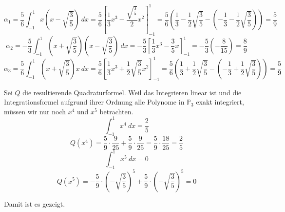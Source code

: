 \documentclass[10pt,a4paper]{article}
\begin{document}
\begin{equation}
  \alpha_{1} = \frac{5}{6} \int_{-1}^{1} x(x - \sqrt{\frac{3}{5}})\ dx = \frac{5}{6} \left[ \frac{1}{3}x^{3} - \frac{\sqrt{\frac{3}{5}}}{2}x^{2} \right]_{-1}^{1} = \frac{5}{6}\left( \frac{1}{3} - \frac{1}{2}\sqrt{\frac{3}{5}} - \left(-\frac{1}{3} - \frac{1}{2}\sqrt{\frac{3}{5}} \right) \right) = \frac{5}{9}
\end{equation}
\begin{equation}
  \alpha_{2} = -\frac{5}{3} \int_{-1}^{1} (x + \sqrt{\frac{3}{5}})(x - \sqrt{\frac{3}{5}})\ dx = -\frac{5}{3} \left[ \frac{1}{3}x^{3} - \frac{3}{5}x \right]_{-1}^{1} = -\frac{5}{3}(-\frac{8}{15}) = \frac{8}{9}
\end{equation}
\begin{equation}
  \alpha_{3} = \frac{5}{6} \int_{-1}^{1} (x + \sqrt{\frac{3}{5}})x\ dx = \frac{5}{6} \left[ \frac{1}{3}x^{3} + \frac{1}{2}\sqrt{\frac{3}{5}}x^{2} \right]_{-1}^{1} = \frac{5}{6}\left( \frac{1}{3} + \frac{1}{2}\sqrt{\frac{3}{5}} - \left( -\frac{1}{3} + \frac{1}{2}\sqrt{\frac{3}{5}} \right) \right) = \frac{5}{9}
\end{equation}

Sei $Q$ die resultierende Quadraturformel.
Weil das Integrieren linear ist und die Integrationsformel aufgrund ihrer Ordnung alle Polynome in $\mathbb{P}_{3}$ exakt integriert, müssen wir nur noch $x^{4}$ und $x^{5}$ betrachten.
\begin{equation}
  \int_{-1}^{1} x^{4}\ dx = \frac{2}{5}
\end{equation}
\begin{equation}
  Q(x^{4}) = \frac{5}{9} \cdot \frac{9}{25} + \frac{5}{9} \cdot \frac{9}{25} = \frac{5}{9} \cdot \frac{18}{25} = \frac{2}{5}
\end{equation}
\begin{equation}
  \int_{-1}^{1} x^{5}\ dx = 0
\end{equation}
\begin{equation}
  Q(x^{5}) = -\frac{5}{9} \cdot \left( -\sqrt{\frac{3}{5}} \right)^{5} + \frac{5}{9} \cdot \left( -\sqrt{\frac{3}{5}} \right)^{5} = 0
\end{equation}

Damit ist es gezeigt.
\end{document}
